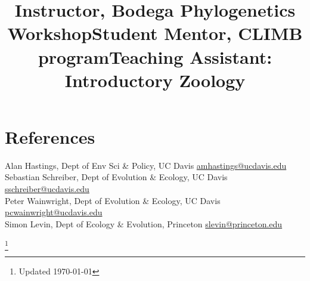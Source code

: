 \documentclass[margin]{res}
\begin{document}
\begin{resume}
\title{Instructor, Bodega Phylogenetics Workshop}
\begin{position}
  \vspace{-.5cm}
\end{position}


\title{Student Mentor, CLIMB program}
\begin{position}
  \vspace{-.5cm}
\end{position}

\title{Teaching Assistant: Introductory Zoology}
\begin{position}
  \vspace{-.5cm}
\end{position}





\section{References}

Alan Hastings, Dept of Env Sci \& Policy, UC Davis \href{mailto:amhastings@ucdavis.edu}{amhastings@ucdavis.edu} \\ 
Sebastian Schreiber, Dept of Evolution \& Ecology, UC Davis \href{mailto:sschreiber@ucdavis.edu}{sschreiber@ucdavis.edu} \\
Peter Wainwright, Dept of Evolution \& Ecology, UC Davis \href{mailto:pcwainwright@ucdavis.edu}{pcwainwright@ucdavis.edu} \\
Simon Levin, Dept of Ecology \& Evolution, Princeton \href{mailto:slevin@princeton.edu}{slevin@princeton.edu}

\end{resume}
\let\thefootnote\relax\footnote{Updated \today}
\end{document}
